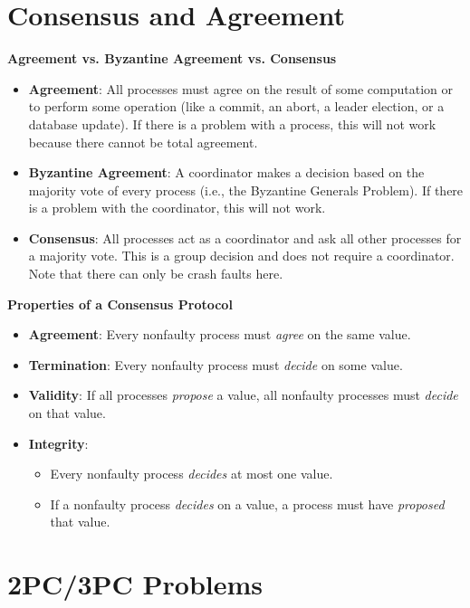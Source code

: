 \documentclass[twoside]{article}
\begin{document}
\section{Consensus and Agreement}

\textbf{Agreement vs. Byzantine Agreement vs. Consensus}
\begin{itemize}
    \item \textbf{Agreement}: All processes must agree on the result of some computation or to perform some operation (like a commit, an abort, a leader election, or a database update). If there is a problem with a process, this will not work because there cannot be total agreement.
    \item \textbf{Byzantine Agreement}: A coordinator makes a decision based on the majority vote of every process (i.e., the Byzantine Generals Problem). If there is a problem with the coordinator, this will not work.
    \item \textbf{Consensus}: All processes act as a coordinator and ask all other processes for a majority vote. This is a group decision and does not require a coordinator. Note that there can only be crash faults here.
\end{itemize}

\textbf{Properties of a Consensus Protocol}
\begin{itemize}
    \item \textbf{Agreement}: Every nonfaulty process must \emph{agree} on the same value.
    \item \textbf{Termination}: Every nonfaulty process must \emph{decide} on some value.
    \item \textbf{Validity}: If all processes \emph{propose} a value, all nonfaulty processes must \emph{decide} on that value.
    \item \textbf{Integrity}: 
        \begin{itemize}
            \item Every nonfaulty process \emph{decides} at most one value.
            \item If a nonfaulty process \emph{decides} on a value, a process must have \emph{proposed} that value.
        \end{itemize}
\end{itemize}

\section{2PC/3PC Problems}
\end{document}
